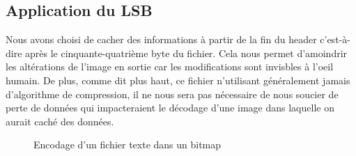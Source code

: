 \subsection{Application du LSB}
Nous avons choisi de cacher des informations à partir de la fin du header c'est-à-dire après le cinquante-quatrième byte du fichier.
Cela nous permet d'amoindrir les altérations de l'image en sortie car les modifications sont invisbles à l'oeil humain.
De plus, comme dit plus haut, ce fichier n'utilisant généralement jamais d'algorithme de compression, il ne nous sera pas nécessaire
de nous soucier de perte de données qui impacteraient le décodage d'une image dans laquelle on aurait caché des données.

\vspace{1.5cm}

\begin{figure}[H]
    \centering
    \hfill %
    \caption{Encodage d'un fichier texte dans un bitmap}
\end{figure}